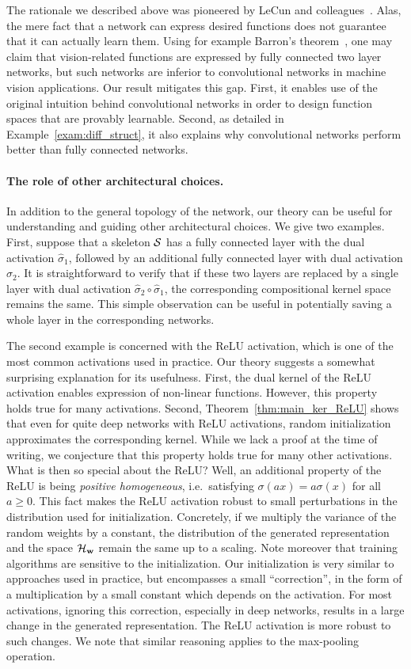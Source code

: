 The rationale we described above was pioneered by LeCun and
colleagues~\cite{lecun1998gradient}. Alas, the mere fact that a network can
express desired functions does not guarantee that it can actually learn
them.  Using for example Barron's theorem~\cite{Barron93}, one may claim
that vision-related functions are expressed by fully connected two layer
networks, but such networks are inferior to convolutional networks in
machine vision applications. Our result mitigates this gap. First, it
enables use of the original intuition behind convolutional networks in order
to design function spaces that are provably learnable. Second, as detailed
in Example~\ref{exam:diff_struct}, it also explains why convolutional
networks perform better than fully connected networks.

\paragraph{The role of other architectural choices.} In addition to the
general topology of the network, our theory can be useful for understanding
and guiding other architectural choices. We give two examples. First,
suppose that a skeleton ${\cal S}$ has a fully connected layer with the dual
activation $\hat{\sigma}_1$, followed by an additional fully connected layer
with dual activation $\hat{\sigma}_2$. It is straightforward to verify that if these
two layers are replaced by a single layer with dual activation
$\hat{\sigma}_2\circ \hat{\sigma}_1$, the corresponding compositional kernel
space remains the same. This simple observation can be useful in
potentially saving a whole layer in the corresponding networks.

The second example is concerned with the ReLU activation, which is one of the
most common activations used in practice. Our theory suggests a
somewhat surprising explanation for its usefulness. First, the dual kernel
of the ReLU activation enables expression of non-linear functions. However, this
property holds true for many activations. Second,
Theorem~\ref{thm:main_ker_ReLU} shows that even for quite deep networks with
ReLU activations, random initialization approximates the corresponding
kernel. While we lack a proof at the time of writing, we conjecture that this property holds true for many other activations. 
What is then so special about the ReLU? Well,
an additional property of the ReLU is being {\em
positive homogeneous}, i.e.\ satisfying $\sigma(ax)=a\sigma(x)$ for all
$a\ge 0$.  This fact makes the ReLU activation robust to small perturbations
in the distribution used for initialization. Concretely, if we multiply the
variance of the random weights by a constant, the distribution of the
generated representation and the space ${\cal H}_{\mathbf w}$ remain the same up to a
scaling. Note moreover that training algorithms are sensitive to the
initialization.  Our initialization is very similar to approaches used in
practice, but encompasses a small ``correction'', in the form of a
multiplication by a small constant which depends on the activation.  For
most activations, ignoring this correction, especially in deep networks,
results in a large change in the generated representation. The ReLU
activation is more robust to such changes. We note that
similar reasoning applies to the max-pooling operation.

